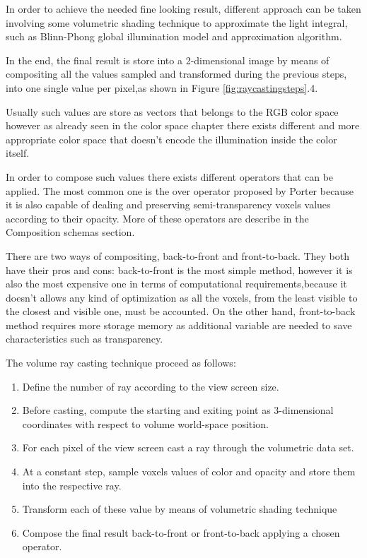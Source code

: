 \documentclass[12pt,a4paper]{extarticle}
\newcommand{\linespace}{\vspace{8pt}}
\begin{document}
In order to achieve the needed fine looking result, different approach can be taken involving some volumetric shading technique to approximate the light integral, such as Blinn-Phong global illumination model and approximation algorithm.
\linespace

In the end, the final result is store into a 2-dimensional image by means of compositing all the values sampled and transformed during the previous steps, into one single value per pixel,as shown in Figure \ref{fig:raycastingsteps}.4.

Usually such values are store as vectors that belongs to the RGB color space%
however as already seen in the color space chapter there exists different and more appropriate color space that doesn't encode the illumination inside the color itself.
\linespace

In order to compose such values there exists different operators that can be applied. The most common one is the over operator proposed by Porter%
 because it is also capable of dealing and preserving semi-transparency voxels values according to their opacity. More of these operators are describe in the Composition schemas section.
\linespace

There are two ways of compositing, back-to-front and front-to-back. They both have their pros and cons: back-to-front is the most simple method, however it is also the most expensive one in terms of computational requirements,because it doesn't allows any kind of optimization as all the voxels, from the least visible to the closest and visible one, must be accounted.
On the other hand, front-to-back method requires more storage memory as additional variable are needed to save characteristics such as transparency.
\linespace

The volume ray casting technique proceed as follows:
\begin{enumerate}
\item Define the number of ray according to the view screen size.
\item Before casting, compute the starting and exiting point as 3-dimensional coordinates with respect to volume world-space position.
\item For each pixel of the view screen cast a ray through the volumetric data set.
\item At a constant step, sample voxels values of color and opacity and store them into the respective ray.
\item Transform each of these value by means of volumetric shading technique
\item Compose the final result back-to-front or front-to-back applying a chosen operator.
\end{enumerate}
\end{document}
